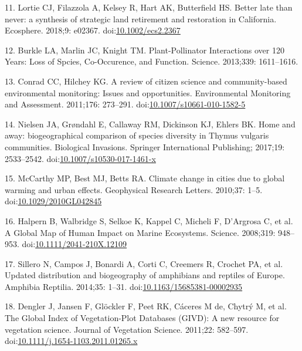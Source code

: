 \documentclass[10pt,letterpaper]{article}
\begin{document}
\hypertarget{ref-Lortie2018}{}
11. Lortie CJ, Filazzola A, Kelsey R, Hart AK, Butterfield HS. Better
late than never: a synthesis of strategic land retirement and
restoration in California. Ecosphere. 2018;9: e02367.
doi:\href{https://doi.org/10.1002/ecs2.2367}{10.1002/ecs2.2367}

\hypertarget{ref-Burkle2013}{}
12. Burkle LA, Marlin JC, Knight TM. Plant-Pollinator Interactions over
120 Years: Loss of Spcies, Co-Occurence, and Function. Science.
2013;339: 1611--1616.

\hypertarget{ref-Conrad2011}{}
13. Conrad CC, Hilchey KG. A review of citizen science and
community-based environmental monitoring: Issues and opportunities.
Environmental Monitoring and Assessment. 2011;176: 273--291.
doi:\href{https://doi.org/10.1007/s10661-010-1582-5}{10.1007/s10661-010-1582-5}

\hypertarget{ref-Nielsen2017}{}
14. Nielsen JA, Grøndahl E, Callaway RM, Dickinson KJ, Ehlers BK. Home
and away: biogeographical comparison of species diversity in Thymus
vulgaris communities. Biological Invasions. Springer International
Publishing; 2017;19: 2533--2542.
doi:\href{https://doi.org/10.1007/s10530-017-1461-x}{10.1007/s10530-017-1461-x}

\hypertarget{ref-McCarthy2010}{}
15. McCarthy MP, Best MJ, Betts RA. Climate change in cities due to
global warming and urban effects. Geophysical Research Letters. 2010;37:
1--5.
doi:\href{https://doi.org/10.1029/2010GL042845}{10.1029/2010GL042845}

\hypertarget{ref-Halpern2008}{}
16. Halpern B, Walbridge S, Selkoe K, Kappel C, Micheli F, D'Argrosa C,
et al. A Global Map of Human Impact on Marine Ecosystems. Science.
2008;319: 948--953.
doi:\href{https://doi.org/10.1111/2041-210X.12109}{10.1111/2041-210X.12109}

\hypertarget{ref-Sillero2014}{}
17. Sillero N, Campos J, Bonardi A, Corti C, Creemers R, Crochet PA, et
al. Updated distribution and biogeography of amphibians and reptiles of
Europe. Amphibia Reptilia. 2014;35: 1--31.
doi:\href{https://doi.org/10.1163/15685381-00002935}{10.1163/15685381-00002935}

\hypertarget{ref-Dengler2011}{}
18. Dengler J, Jansen F, Glöckler F, Peet RK, Cáceres M de, Chytrý M, et
al. The Global Index of Vegetation-Plot Databases (GIVD): A new resource
for vegetation science. Journal of Vegetation Science. 2011;22:
582--597.
doi:\href{https://doi.org/10.1111/j.1654-1103.2011.01265.x}{10.1111/j.1654-1103.2011.01265.x}
\end{document}
